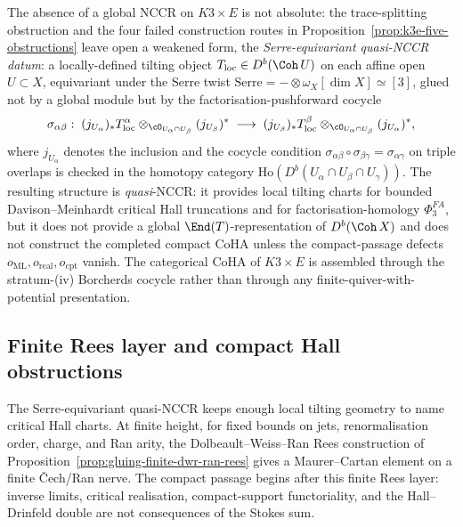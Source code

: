 \begin{remark}
\label{rem:serre-equivariant}
The absence of a global NCCR on $K3 \times E$ is not absolute: the
trace-splitting obstruction and the four failed construction routes in
Proposition~\ref{prop:k3e-five-obstructions} leave open a weakened
form, the \emph{Serre-equivariant quasi-NCCR datum}: a locally-defined
tilting object $T_{\mathrm{loc}} \in D^b(\Coh\,U)$ on each affine open
$U \subset X$, equivariant under the Serre twist
$\mathrm{Serre} = - \otimes \omega_X[\dim X] \simeq [3]$, glued not by a
global module but by the factorisation-pushforward cocycle
\[
 \sigma_{\alpha\beta}:\;
 (j_{U_\alpha})_\ast T_{\mathrm{loc}}^\alpha \otimes_{\cO_{U_\alpha \cap
 U_\beta}} (j_{U_\beta})^\ast \;\longrightarrow\;
 (j_{U_\beta})_\ast T_{\mathrm{loc}}^\beta \otimes_{\cO_{U_\alpha\cap
 U_\beta}} (j_{U_\alpha})^\ast,
\]
where $j_{U_\alpha}$ denotes the inclusion and the cocycle condition
$\sigma_{\alpha\beta}\circ\sigma_{\beta\gamma}
= \sigma_{\alpha\gamma}$ on triple overlaps is checked in the homotopy
category $\mathrm{Ho}(D^b(U_\alpha\cap U_\beta\cap U_\gamma))$. The
resulting structure is \emph{quasi}-NCCR: it provides local tilting
charts for bounded Davison--Meinhardt critical Hall truncations and for
factorisation-homology $\Phi^{FA}_3$, but it does not provide a global
$\End(T)$-representation of $D^b(\Coh\,X)$ and does not construct the
completed compact CoHA unless the compact-passage defects
$o_{\mathrm{ML}},o_{\mathrm{real}},o_{\mathrm{cpt}}$ vanish. The
categorical CoHA of $K3\times E$ is assembled through the stratum-(iv)
Borcherds cocycle rather than through any finite-quiver-with-potential
presentation.
\end{remark}
\subsection{Finite Rees layer and compact Hall obstructions}
\label{sec:compact-oriented-critical-hall-cosheaves}

The Serre-equivariant quasi-NCCR keeps enough local tilting geometry to
name critical Hall charts. At finite height, for fixed bounds on jets,
renormalisation order, charge, and Ran arity, the
Dolbeault--Weiss--Ran Rees construction of
Proposition~\ref{prop:gluing-finite-dwr-ran-rees} gives a
Maurer--Cartan element on a finite \v{C}ech/Ran nerve. The compact
passage begins after this finite Rees layer: inverse limits, critical
realisation, compact-support functoriality, and the Hall--Drinfeld
double are not consequences of the Stokes sum.

